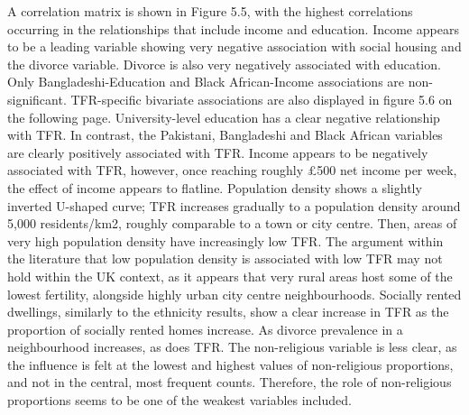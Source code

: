 \documentclass[12pt,twoside]{reedthesis}
\begin{document}
A correlation matrix is shown in Figure 5.5, with the highest correlations occurring in the relationships that include income and education. Income appears to be a leading variable showing very negative association with social housing and the divorce variable. Divorce is also very negatively associated with education. Only Bangladeshi-Education and Black African-Income associations are non-significant. TFR-specific bivariate associations are also displayed in figure 5.6 on the following page. University-level education has a clear negative relationship with TFR. In contrast, the Pakistani, Bangladeshi and Black African variables are clearly positively associated with TFR. Income appears to be negatively associated with TFR, however, once reaching roughly £500 net income per week, the effect of income appears to flatline. Population density shows a slightly inverted U-shaped curve; TFR increases gradually to a population density around 5,000 residents/km2, roughly comparable to a town or city centre. Then, areas of very high population density have increasingly low TFR. The argument within the literature that low population density is associated with low TFR may not hold within the UK context, as it appears that very rural areas host some of the lowest fertility, alongside highly urban city centre neighbourhoods. Socially rented dwellings, similarly to the ethnicity results, show a clear increase in TFR as the proportion of socially rented homes increase. As divorce prevalence in a neighbourhood increases, as does TFR. The non-religious variable is less clear, as the influence is felt at the lowest and highest values of non-religious proportions, and not in the central, most frequent counts. Therefore, the role of non-religious proportions seems to be one of the weakest variables included.
\end{document}
